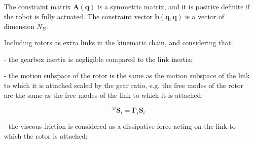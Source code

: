 The constraint matrix $\mathbf{A} (\mathbf{q})$ is a symmetric matrix, and it is positive definite if the robot is fully actuated. The constraint vector $\mathbf{b} (\mathbf{q}, \dot{\mathbf{q}})$ is a vector of dimension $N_B$.

Including rotors as extra links in the kinematic chain, and considering that:

- the gearbox inertia is negligible compared to the link inertia;

- the motion subspace of the rotor is the same as the motion subspace of the link to which it is attached scaled by the gear ratio, e.g. the free modes of the rotor are the same as the free modes of the link to which it is attached:

\begin{equation}
    {} ^M \mathbf{S} _i = \boldsymbol{\Gamma} _i \mathbf{S} _i
\end{equation}

- the viscous friction is considered as a dissipative force acting on the link to which the rotor is attached;

